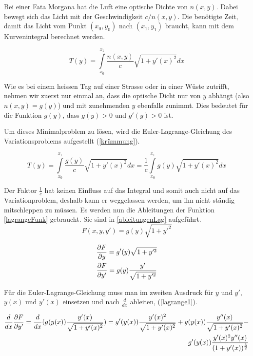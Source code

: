 Bei einer Fata Morgana hat die Luft eine optische Dichte von $n(x,y)$. 
Dabei bewegt sich das Licht mit der Geschwindigkeit $c/n(x,y)$. 
Die benötigte Zeit, damit das Licht vom Punkt $(x_0, y_0)$ nach $(x_1, y_1)$ braucht,
kann mit dem Kurvenintegral berechnet werden.

\begin{equation}
T(y) = \int \limits_{x_0}^{x_1} \frac{n(x,y)}{c} \sqrt{1 + y'(x)^2} dx
\end{equation}

Wie es bei einem heissen Tag auf einer Strasse oder in einer Wüste zutrifft,
nehmen wir zuerst nur einmal an, dass die optische Dicht nur von $y$ abhängt
(also $n(x,y) = g(y)$) und mit zunehmenden $y$ ebenfalls zunimmt. 
Dies bedeutet für die Funktion $g(y)$, dass $g(y) > 0$ und $g'(y) > 0 $ ist.

Um dieses Minimalproblem zu lösen, wird die Euler-Lagrange-Gleichung des Variationsproblems aufgestellt (\eqref{krümmung}).

\begin{equation}
	T(y) = \int \limits_{x_0}^{x_1} \frac{g(y)}{c} \sqrt{1 + y'(x)^2} dx = \frac{1}{c} \int \limits_{x_0}^{x_1} g(y) \sqrt{1 + y'(x)^2} dx
	\label{krümmung}
\end{equation}

Der Faktor $\frac{1}{c}$ hat keinen Einfluss auf das Integral und somit auch nicht auf das Variationproblem, deshalb kann er weggelassen werden, um ihn nicht ständig mitschleppen zu müssen.
Es werden nun die Ableitungen der Funktion \ref{lagrangeFunk} gebraucht. Sie sind in \ref{ableitungenLag} aufgeführt.
\begin{equation}
	F(x,y,y') = g(y) \sqrt{1 + y'^2}
	\label{lagrangeFunk}
\end{equation}

\begin{align}
	\frac{\partial F}{\partial y} = g'(y) \sqrt{1 + y'^2} \notag \\
	\frac{\partial F}{\partial y'} = g(y) \frac{y'}{\sqrt{1 + y'^2}}
	\label{ableitungenLag}
\end{align}

Für die Euler-Lagrange-Gleichung muss man im zweiten Ausdruck für $y$ und $y'$, $y(x)$ 
und $y'(x)$ einsetzen und nach $\frac{d}{dx}$ ableiten, (\eqref{lagrange1}).

\begin{align}
	\frac{d}{dx} \frac{\partial F}{\partial y'} = \frac{d}{dx} (g(y(x)) \frac{y'(x)}{\sqrt{1 + y'(x)^2}})
	 = g'(y(x)) \frac{y'(x)^2}{\sqrt{1 + y'(x)^2}} + g(y(x)) \frac{y''(x)}{\sqrt{1 + y'(x)^2}} - \notag \\
	 g'(y(x)) \frac{y'(x)^2 y''(x)}{(1 + y'(x))^\frac{3}{2}} 
	 \label{lagrange1}
\end{align}

